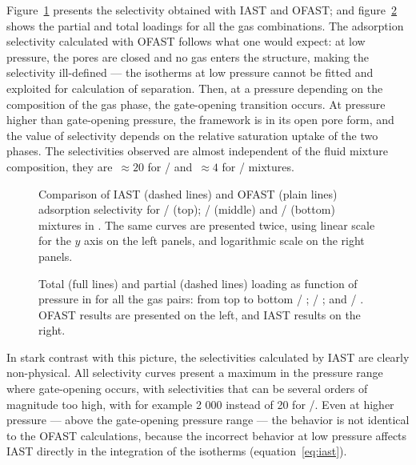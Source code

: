 \documentclass[thesis]{subfiles}
\begin{document}
Figure~\ref{fig:cu-dhbc:iast-ofast:selectivity} presents the selectivity
obtained with IAST and OFAST; and figure~\ref{fig:cu-dhbc:iast-ofast:loadings}
shows the partial and total loadings for all the gas combinations. The
adsorption selectivity calculated with OFAST follows what one would expect: at
low pressure, the pores are closed and no gas enters the structure, making the
selectivity ill-defined --- the isotherms at low pressure cannot be fitted and
exploited for calculation of separation. Then, at a pressure depending on the
composition of the gas phase, the gate-opening transition occurs. At pressure
higher than gate-opening pressure, the framework is in its open pore form, and
the value of selectivity depends on the relative saturation uptake of the two
phases. The selectivities observed are almost independent of the fluid mixture
composition, they are~$\approx 20$ for / and~$\approx 4$ for
/ mixtures.

\begin{figure}[htp]
    \centering
    
    \caption{Comparison of IAST (dashed lines) and OFAST (plain lines)
    adsorption selectivity for / (top); / (middle)
    and / (bottom) mixtures in \Cudhbc. The same curves are
    presented twice, using linear scale for the $y$ axis on the left panels, and
    logarithmic scale on the right panels.}
    \label{fig:cu-dhbc:iast-ofast:selectivity}
\end{figure}

\begin{figure}[htp]
    \centering
    
    \caption{Total (full lines) and partial (dashed lines) loading as function
    of pressure in \Cudhbc for all the gas pairs: from top to bottom  /
    ;  / ; and  / . OFAST results are
    presented on the left, and IAST results on the right.}
    \label{fig:cu-dhbc:iast-ofast:loadings}
\end{figure}

In stark contrast with this picture, the selectivities calculated by IAST are
clearly non-physical. All selectivity curves present a maximum in the pressure
range where gate-opening occurs, with selectivities that can be several orders
of magnitude too high, with for example 2 000 instead of 20 for
/. Even at higher pressure --- above the gate-opening pressure
range --- the behavior is not identical to the OFAST calculations, because the
incorrect behavior at low pressure affects IAST directly in the integration of
the isotherms (equation~\eqref{eq:iast}).
\end{document}
